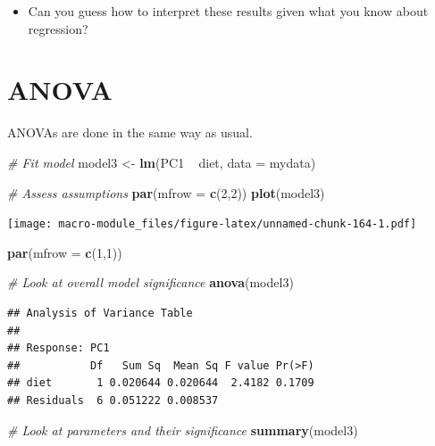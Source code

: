 \documentclass[]{book}
\newenvironment{Shaded}{\begin{snugshade}}{\end{snugshade}}
\newcommand{\KeywordTok}[1]{\textcolor[rgb]{0.13,0.29,0.53}{\textbf{{#1}}}}
\newcommand{\DataTypeTok}[1]{\textcolor[rgb]{0.13,0.29,0.53}{{#1}}}
\newcommand{\DecValTok}[1]{\textcolor[rgb]{0.00,0.00,0.81}{{#1}}}
\newcommand{\StringTok}[1]{\textcolor[rgb]{0.31,0.60,0.02}{{#1}}}
\newcommand{\CommentTok}[1]{\textcolor[rgb]{0.56,0.35,0.01}{\textit{{#1}}}}
\newcommand{\NormalTok}[1]{{#1}}
\providecommand{\tightlist}{%
  \setlength{\itemsep}{0pt}\setlength{\parskip}{0pt}}
\theoremstyle{definition}
\theoremstyle{definition}
\theoremstyle{definition}
\theoremstyle{remark}
\begin{document}
\begin{itemize}
\tightlist
\item
  Can you guess how to interpret these results given what you know about
  regression?
\end{itemize}

\section{ANOVA}\label{anova}

ANOVAs are done in the same way as usual.

\begin{Shaded}
\begin{Highlighting}[]
\CommentTok{# Fit model}
\NormalTok{model3 <-}\StringTok{ }\KeywordTok{lm}\NormalTok{(PC1 ~}\StringTok{ }\NormalTok{diet, }\DataTypeTok{data =} \NormalTok{mydata)}

\CommentTok{# Assess assumptions}
\KeywordTok{par}\NormalTok{(}\DataTypeTok{mfrow =} \KeywordTok{c}\NormalTok{(}\DecValTok{2}\NormalTok{,}\DecValTok{2}\NormalTok{))}
\KeywordTok{plot}\NormalTok{(model3)}
\end{Highlighting}
\end{Shaded}

\texttt{[image: macro-module\_files/figure-latex/unnamed-chunk-164-1.pdf]}

\begin{Shaded}
\begin{Highlighting}[]
\KeywordTok{par}\NormalTok{(}\DataTypeTok{mfrow =} \KeywordTok{c}\NormalTok{(}\DecValTok{1}\NormalTok{,}\DecValTok{1}\NormalTok{))}

\CommentTok{# Look at overall model significance}
\KeywordTok{anova}\NormalTok{(model3)}
\end{Highlighting}
\end{Shaded}

\begin{verbatim}
## Analysis of Variance Table
## 
## Response: PC1
##           Df   Sum Sq  Mean Sq F value Pr(>F)
## diet       1 0.020644 0.020644  2.4182 0.1709
## Residuals  6 0.051222 0.008537
\end{verbatim}

\begin{Shaded}
\begin{Highlighting}[]
\CommentTok{# Look at parameters and their significance}
\KeywordTok{summary}\NormalTok{(model3)}
\end{Highlighting}
\end{Shaded}
\end{document}
